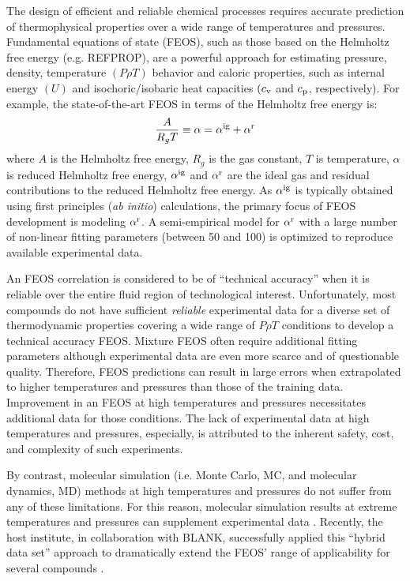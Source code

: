 \documentclass[11pt,a4paper]{article}
\begin{document}
The design of efficient and reliable chemical processes requires accurate prediction of thermophysical properties over a wide range of temperatures and pressures. Fundamental equations of state (FEOS), such as those based on the Helmholtz free energy (e.g. REFPROP), are a powerful approach for estimating pressure, density, temperature $(P\rho T)$ behavior and caloric properties, such as internal energy $(U)$ and isochoric/isobaric heat capacities $(c_{\rm v}$ and $c_{\rm p}$, respectively). For example, the state-of-the-art FEOS in terms of the Helmholtz free energy is:
\begin{equation}
\frac{A}{R_gT} \equiv \alpha = \alpha^{\rm ig} + \alpha^{\rm r}
\end{equation} 
where $A$ is the Helmholtz free energy, $R_g$ is the gas constant, $T$ is temperature, $\alpha$ is reduced Helmholtz free energy, $\alpha^{\rm ig}$ and $\alpha^{\rm r}$ are the ideal gas and residual contributions to the reduced Helmholtz free energy. As $\alpha^{\rm ig}$ is typically obtained using first principles (\textit{ab initio}) calculations, the primary focus of FEOS development is modeling $\alpha^{\rm r}$. A semi-empirical model for $\alpha^{\rm r}$ with a large number of non-linear fitting parameters (between 50 and 100) is optimized to reproduce available experimental data. 

An FEOS correlation is considered to be of ``technical accuracy'' when it is reliable over the entire fluid region of technological interest. Unfortunately, most compounds do not have sufficient \textit{reliable} experimental data for a diverse set of thermodynamic properties covering a wide range of $P \rho T$ conditions to develop a technical accuracy FEOS. Mixture FEOS often require additional fitting parameters although experimental data are even more scarce and of questionable quality. Therefore, FEOS predictions can result in large errors when extrapolated to higher temperatures and pressures than those of the training data. Improvement in an FEOS at high temperatures and pressures necessitates additional data for those conditions. The lack of experimental data at high temperatures and pressures, especially, is attributed to the inherent safety, cost, and complexity of such experiments.

By contrast, molecular simulation (i.e. Monte Carlo, MC, and molecular dynamics, MD) methods at high temperatures and pressures do not suffer from any of these limitations. For this reason, molecular simulation results at extreme temperatures and pressures can supplement experimental data \cite{Thol2016_LJ,Thol_LJTS,Rutkai2017,Lustig2015,Rutkai2015}. Recently, the host institute, in collaboration with BLANK, successfully applied this ``hybrid data set'' approach to dramatically extend the FEOS' range of applicability for several compounds \cite{Rutkai2013,Thol2016_siloxane_first,Thol2016_siloxane,Thol2017,Thol2015}.
\end{document}

